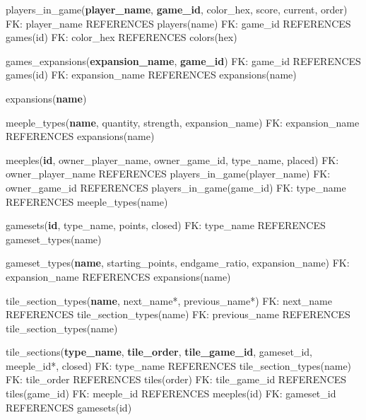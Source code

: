 players\_in\_game(\textbf{player\_name}, \textbf{game\_id}, color\_hex, score, current, order)\newline
FK: player\_name REFERENCES players(name)\newline
FK: game\_id REFERENCES games(id)\newline
FK: color\_hex REFERENCES colors(hex)\newline

games\_expansions(\textbf{expansion\_name}, \textbf{game\_id})\newline
FK: game\_id REFERENCES games(id)\newline
FK: expansion\_name REFERENCES expansions(name)\newline

expansions(\textbf{name})\newline

meeple\_types(\textbf{name}, quantity, strength, expansion\_name)\newline
FK: expansion\_name REFERENCES expansions(name)\newline

meeples(\textbf{id}, owner\_player\_name, owner\_game\_id, type\_name, placed)\newline
FK: owner\_player\_name REFERENCES players\_in\_game(player\_name)\newline
FK: owner\_game\_id REFERENCES players\_in\_game(game\_id)\newline
FK: type\_name REFERENCES meeple\_types(name)\newline

gamesets(\textbf{id}, type\_name, points, closed)\newline
FK: type\_name REFERENCES gameset\_types(name)\newline

gameset\_types(\textbf{name}, starting\_points, endgame\_ratio, expansion\_name)\newline
FK: expansion\_name REFERENCES expansions(name)\newline

tile\_section\_types(\textbf{name}, next\_name*, previous\_name*)\newline
FK: next\_name REFERENCES tile\_section\_types(name)\newline
FK: previous\_name REFERENCES tile\_section\_types(name)\newline

tile\_sections(\textbf{type\_name}, \textbf{tile\_order}, \textbf{tile\_game\_id}, gameset\_id, meeple\_id*, closed)\newline
FK: type\_name REFERENCES tile\_section\_types(name)\newline
FK: tile\_order REFERENCES tiles(order)\newline
FK: tile\_game\_id REFERENCES tiles(game\_id)\newline
FK: meeple\_id REFERENCES meeples(id)\newline
FK: gameset\_id REFERENCES gamesets(id)\newline

